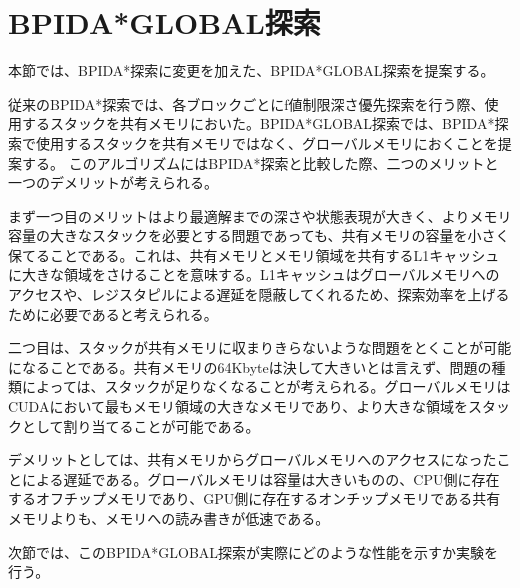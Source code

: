 \documentclass[a4paper,11pt,oneside,openany]{jsbook}
\begin{document}
\section{BPIDA*GLOBAL探索}
本節では、BPIDA*探索\cite{HA17}に変更を加えた、BPIDA*GLOBAL探索を提案する。

従来のBPIDA*探索では、各ブロックごとにf値制限深さ優先探索を行う際、使用するスタックを共有メモリにおいた。BPIDA*GLOBAL探索では、BPIDA*探索で使用するスタックを共有メモリではなく、グローバルメモリにおくことを提案する。
このアルゴリズムにはBPIDA*探索と比較した際、二つのメリットと一つのデメリットが考えられる。

まず一つ目のメリットはより最適解までの深さや状態表現が大きく、よりメモリ容量の大きなスタックを必要とする問題であっても、共有メモリの容量を小さく保てることである。これは、共有メモリとメモリ領域を共有するL1キャッシュに大きな領域をさけることを意味する。L1キャッシュはグローバルメモリへのアクセスや、レジスタピルによる遅延を隠蔽してくれるため、探索効率を上げるために必要であると考えられる。

二つ目は、スタックが共有メモリに収まりきらないような問題をとくことが可能になることである。共有メモリの64Kbyteは決して大きいとは言えず、問題の種類によっては、スタックが足りなくなることが考えられる。グローバルメモリはCUDAにおいて最もメモリ領域の大きなメモリであり、より大きな領域をスタックとして割り当てることが可能である。

デメリットとしては、共有メモリからグローバルメモリへのアクセスになったことによる遅延である。グローバルメモリは容量は大きいものの、CPU側に存在するオフチップメモリであり、GPU側に存在するオンチップメモリである共有メモリよりも、メモリへの読み書きが低速である。

次節では、このBPIDA*GLOBAL探索が実際にどのような性能を示すか実験を行う。
\end{document}
